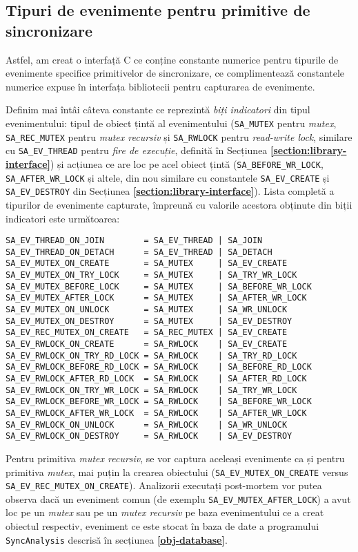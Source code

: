 \subsection{Tipuri de evenimente pentru primitive de sincronizare}
\label{section:event-types}

Astfel, am creat
o interfață C ce conține constante numerice pentru tipurile de
evenimente specifice primitivelor de sincronizare, ce complimentează
constantele numerice expuse în interfața bibliotecii pentru capturarea
de evenimente.

Definim mai întâi câteva constante ce reprezintă
\textit{biți indicatori} din tipul evenimentului: tipul de obiect
țintă al evenimentului (\lstinline{SA_MUTEX} pentru \textit{mutex},
\lstinline{SA_REC_MUTEX} pentru \textit{mutex recursiv} și
\lstinline{SA_RWLOCK} pentru \textit{read-write lock}, similare cu
\lstinline{SA_EV_THREAD} pentru \textit{fire de execuție}, definită în
Secțiunea \textbf{\ref{section:library-interface}}) și acțiunea ce are
loc pe acel obiect țintă (\lstinline{SA_BEFORE_WR_LOCK},
\lstinline{SA_AFTER_WR_LOCK} și altele, din nou similare cu constantele
\lstinline{SA_EV_CREATE} și \lstinline{SA_EV_DESTROY} din Secțiunea
\textbf{\ref{section:library-interface}}). Lista completă a tipurilor de
evenimente capturate, împreună cu valorile acestora obținute din biții
indicatori este următoarea:

\begin{lstlisting}[caption=Tipurile de evenimente pentru primitivele de
                           sincronizare, label=code:syan-event-types]
SA_EV_THREAD_ON_JOIN        = SA_EV_THREAD | SA_JOIN
SA_EV_THREAD_ON_DETACH      = SA_EV_THREAD | SA_DETACH
SA_EV_MUTEX_ON_CREATE       = SA_MUTEX     | SA_EV_CREATE
SA_EV_MUTEX_ON_TRY_LOCK     = SA_MUTEX     | SA_TRY_WR_LOCK
SA_EV_MUTEX_BEFORE_LOCK     = SA_MUTEX     | SA_BEFORE_WR_LOCK
SA_EV_MUTEX_AFTER_LOCK      = SA_MUTEX     | SA_AFTER_WR_LOCK
SA_EV_MUTEX_ON_UNLOCK       = SA_MUTEX     | SA_WR_UNLOCK
SA_EV_MUTEX_ON_DESTROY      = SA_MUTEX     | SA_EV_DESTROY
SA_EV_REC_MUTEX_ON_CREATE   = SA_REC_MUTEX | SA_EV_CREATE
SA_EV_RWLOCK_ON_CREATE      = SA_RWLOCK    | SA_EV_CREATE
SA_EV_RWLOCK_ON_TRY_RD_LOCK = SA_RWLOCK    | SA_TRY_RD_LOCK
SA_EV_RWLOCK_BEFORE_RD_LOCK = SA_RWLOCK    | SA_BEFORE_RD_LOCK
SA_EV_RWLOCK_AFTER_RD_LOCK  = SA_RWLOCK    | SA_AFTER_RD_LOCK
SA_EV_RWLOCK_ON_TRY_WR_LOCK = SA_RWLOCK    | SA_TRY_WR_LOCK
SA_EV_RWLOCK_BEFORE_WR_LOCK = SA_RWLOCK    | SA_BEFORE_WR_LOCK
SA_EV_RWLOCK_AFTER_WR_LOCK  = SA_RWLOCK    | SA_AFTER_WR_LOCK
SA_EV_RWLOCK_ON_UNLOCK      = SA_RWLOCK    | SA_WR_UNLOCK
SA_EV_RWLOCK_ON_DESTROY     = SA_RWLOCK    | SA_EV_DESTROY
\end{lstlisting}

Pentru primitiva \textit{mutex recursiv}, se vor captura aceleași
evenimente ca și pentru primitiva \textit{mutex}, mai puțin la crearea
obiectului (\lstinline{SA_EV_MUTEX_ON_CREATE} versus
\lstinline{SA_EV_REC_MUTEX_ON_CREATE}). Analizorii executați post-mortem
vor putea observa dacă un eveniment comun (de exemplu
\lstinline{SA_EV_MUTEX_AFTER_LOCK}) a avut loc pe un \textit{mutex} sau
pe un \textit{mutex recursiv} pe baza evenimentului ce a creat obiectul
respectiv, eveniment ce este stocat în baza de date a programului
\lstinline{SyncAnalysis} descrisă în secțiunea
\textbf{\ref{obj-database}}.
